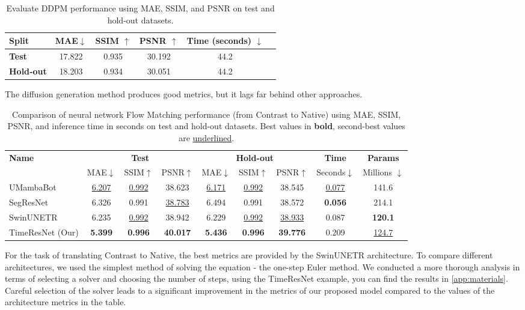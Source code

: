 \documentclass{article}
\begin{document}
\begin{table}[h!]
\centering

\label{tab:ddpm}
\begin{tabular}{lccccc}
\toprule
\textbf{Split} & MAE$\downarrow$ & SSIM $\uparrow$ & PSNR $\uparrow$ & Time (seconds) $\downarrow$\\
\midrule
\textbf{Test}        & 17.822 & 0.935 & 30.192 & 44.2 \\
\textbf{Hold‑out}    & 18.203 & 0.934 & 30.051  & 44.2\\
\bottomrule
\end{tabular}
\vspace{0.2cm}
\caption{Evaluate DDPM performance using MAE, SSIM, and PSNR on test and hold-out datasets.}
\end{table}
The diffusion generation method produces good metrics, but it lags far behind other approaches.


\begin{table}[h!]
\centering
\begin{tabular}{lcccccccc}
\toprule
\textbf{Name} 
  & \multicolumn{3}{c}{\textbf{Test}} 
  & \multicolumn{3}{c}{\textbf{Hold-out}} 
  & \textbf{Time} & \textbf{Params} \\
\cmidrule(lr){2-4} \cmidrule(lr){5-7}
  & MAE$\downarrow$ & SSIM$\uparrow$ & PSNR$\uparrow$  
  & MAE$\downarrow$ & SSIM$\uparrow$ & PSNR$\uparrow$ 
  & Seconds$\downarrow$ & Millions $\downarrow$ \\
\midrule
UMambaBot         & \underline{6.207} & \underline{0.992} & 38.623 
                  & \underline{6.171} & \underline{0.992} & 38.545 & \underline{0.077} & 141.6 \\
SegResNet         & 6.326 & 0.991 & \underline{38.783} 
                  & 6.494 & 0.991 & 38.572 & \textbf{0.056} & 214.1 \\
SwinUNETR         & 6.235 & \underline{0.992} & 38.942 
                  & 6.229 & \underline{0.992} & \underline{38.933} & 0.087 & \textbf{120.1} \\
TimeResNet (Our)  & \textbf{5.399} & \textbf{0.996} & \textbf{40.017} 
                  & \textbf{5.436} & \textbf{0.996} & \textbf{39.776} & 0.209 & \underline{124.7} \\
\bottomrule
\end{tabular}
\vspace{0.2cm}
\caption{Comparison of neural network Flow Matching performance (from Contrast to Native) using MAE, SSIM, PSNR, and inference time in seconds on test and hold-out datasets. Best values in \textbf{bold}, second-best values are \underline{underlined}.}
\label{tab:metrics_comparison_contrast}
\end{table}
For the task of translating Contrast to Native, the best metrics are provided by the SwinUNETR architecture. To compare different architectures, we used the simplest method of solving the equation - the one-step Euler method. We conducted a more thorough analysis in terms of selecting a solver and choosing the number of steps, using the TimeResNet example, you can find the results in \ref{app:materials}. Careful selection of the solver leads to a significant improvement in the metrics of our proposed model compared to the values of the architecture metrics in the table.
\end{document}
